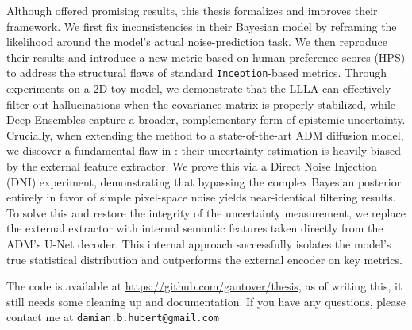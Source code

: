Although \cite{jazbec_generative_2025} offered promising results, this thesis formalizes and improves their framework. We first fix inconsistencies in their Bayesian model by reframing the likelihood around the model's actual noise-prediction task. We then reproduce their results and introduce a new metric based on human preference scores (\acs{HPS}) to address the structural flaws of standard \texttt{Inception}-based metrics. Through experiments on a 2D toy model, we demonstrate that the \acs{LLLA} can effectively filter out hallucinations when the covariance matrix is properly stabilized, while Deep Ensembles capture a broader, complementary form of epistemic uncertainty.
Crucially, when extending the method to a state-of-the-art \acs{ADM} diffusion model, we discover a fundamental flaw in \parencite{jazbec_generative_2025}: their uncertainty estimation is heavily biased by the external feature extractor. We prove this via a Direct Noise Injection (\acs{DNI}) experiment, demonstrating that bypassing the complex Bayesian posterior entirely in favor of simple pixel-space noise yields near-identical filtering results. To solve this and restore the integrity of the uncertainty measurement, we replace the external extractor with internal semantic features taken directly from the \acs{ADM}'s U-Net decoder. This internal approach successfully isolates the model's true statistical distribution and outperforms the external encoder on key metrics.


\vfill

The code is available at \url{https://github.com/gantover/thesis}, as of writing this, it still needs some
cleaning up and documentation. If you have any questions, please contact me at \texttt{damian.b.hubert@gmail.com}

\endgroup			

\vfill